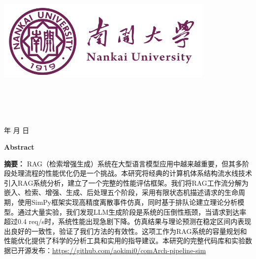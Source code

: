 \documentclass[a4paper]{article}
\begin{document}
\renewcommand{\contentsname}{目\ 录}
\renewcommand{\appendixname}{附录}
\renewcommand{\appendixpagename}{附录}
\renewcommand{\refname}{参考文献} 
\renewcommand{\figurename}{图}
\renewcommand{\tablename}{表}
\renewcommand{\today}{\number\year 年 \number\month 月 \number\day 日}

\begin{titlepage}
    \begin{center}
    \includegraphics[width=0.8\textwidth]{fig/NKU.png}\\[1cm]
    \vspace{20mm}
		\textbf{\huge\textbf{}}\\[0.5cm]
		\textbf{\huge{}}\\[2.3cm]
		\textbf{\Huge\textbf{}}

		\vspace{\fill}
    
    \centering
    \textsc{\LARGE {}}\\[0.5cm]
    \textsc{\LARGE {}}\\[0.5cm]
    
    \vfill
    {\Large \today}
    \end{center}
\end{titlepage}

\renewcommand {\thefigure}{\thesection{}.\arabic{figure}}
\renewcommand{\figurename}{图}
\renewcommand{\contentsname}{目录}  

\clearpage
\tableofcontents
\newpage

\newpage
\begin{center}
\textbf{\Large Abstract}
\end{center}

\textbf{摘要：} RAG（检索增强生成）系统在大型语言模型应用中越来越重要，但其多阶段处理流程的性能优化仍是一个挑战。本研究将经典的计算机体系结构流水线技术引入RAG系统分析，建立了一个完整的性能评估框架。我们将RAG工作流分解为嵌入、检索、增强、生成、后处理五个阶段，采用有限状态机描述请求的生命周期，使用SimPy框架实现高精度离散事件仿真，同时基于排队论建立理论分析模型。通过大量实验，我们发现LLM生成阶段是系统的压倒性瓶颈，当请求到达率超过0.4 req/s时，系统性能出现急剧下降。仿真结果与理论预测在稳定区间内表现出良好的一致性，验证了我们方法的有效性。这项工作为RAG系统的容量规划和性能优化提供了科学的分析工具和实用的指导建议。本研究的完整代码库和实验数据已开源发布：\url{https://github.com/aokimi0/comArch-pipeline-sim}
\end{document}
